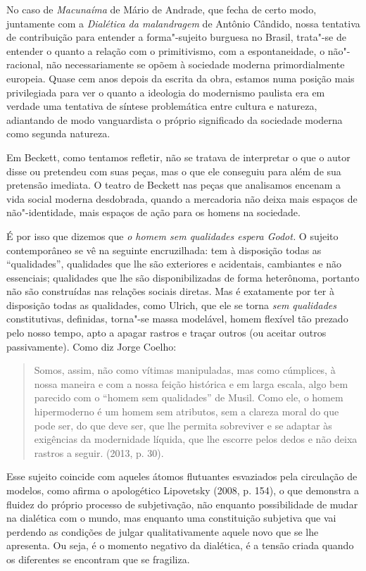 No caso de \emph{Macunaíma} de Mário de Andrade, que fecha de certo
modo, juntamente com a \emph{Dialética da malandragem} de Antônio
Cândido, nossa tentativa de contribuição para entender a forma"-sujeito
burguesa no Brasil, trata"-se de entender o quanto a relação com o
primitivismo, com a espontaneidade, o não"-racional, não necessariamente
se opõem à sociedade moderna primordialmente europeia. Quase cem anos
depois da escrita da obra, estamos numa posição mais privilegiada para
ver o quanto a ideologia do modernismo paulista era em verdade uma
tentativa de síntese problemática entre cultura e natureza, adiantando
de modo vanguardista o próprio significado da sociedade moderna como
segunda natureza.

Em Beckett, como tentamos refletir, não se tratava de interpretar o que
o autor disse ou pretendeu com suas peças, mas o que ele conseguiu para
além de sua pretensão imediata. O teatro de Beckett nas peças que
analisamos encenam a vida social moderna desdobrada, quando a mercadoria
não deixa mais espaços de não"-identidade, mais espaços de ação para os
homens na sociedade.

É por isso que dizemos que \emph{o homem sem qualidades espera Godot.} O
sujeito contemporâneo se vê na seguinte encruzilhada: tem à disposição
todas as ``qualidades'', qualidades que lhe são exteriores e acidentais,
cambiantes e não essenciais; qualidades que lhe são disponibilizadas de
forma heterônoma, portanto não são construídas nas relações sociais
diretas. Mas é exatamente por ter à disposição todas as qualidades, como
Ulrich, que ele se torna \emph{sem qualidades} constitutivas, definidas,
torna"-se massa modelável, homem flexível tão prezado pelo nosso tempo,
apto a apagar rastros e traçar outros (ou aceitar outros passivamente).
Como diz Jorge Coelho:

\begin{quote}
Somos, assim, não como vítimas manipuladas, mas como cúmplices, à nossa
maneira e com a nossa feição histórica e em larga escala, algo bem
parecido com o ``homem sem qualidades'' de Musil. Como ele, o homem
hipermoderno é um homem sem atributos, sem a clareza moral do que pode
ser, do que deve ser, que lhe permita sobreviver e se adaptar às
exigências da modernidade líquida, que lhe escorre pelos dedos e não
deixa rastros a seguir. (2013, p. 30).
\end{quote}

Esse sujeito coincide com aqueles átomos flutuantes esvaziados pela
circulação de modelos, como afirma o apologético Lipovetsky (2008, p.
154), o que demonstra a fluidez do próprio processo de subjetivação, não
enquanto possibilidade de mudar na dialética com o mundo, mas enquanto
uma constituição subjetiva que vai perdendo as condições de julgar
qualitativamente aquele novo que se lhe apresenta. Ou seja, é o momento
negativo da dialética, é a tensão criada quando os diferentes se
encontram que se fragiliza.

